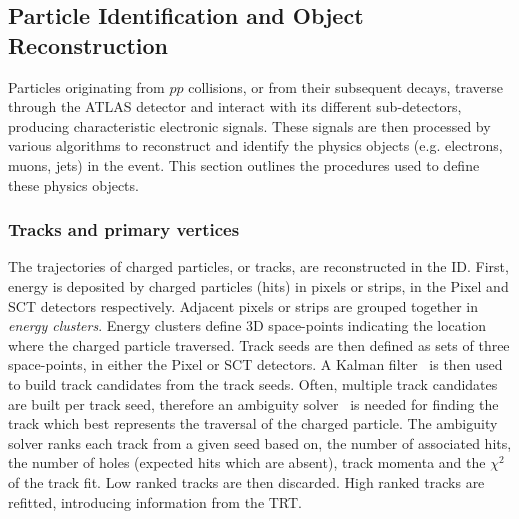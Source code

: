 \subsection{Particle Identification and Object Reconstruction}


Particles originating from $pp$ collisions, or from their subsequent decays, traverse through the ATLAS detector and interact with its different sub-detectors, producing characteristic electronic signals. These signals are then processed by various algorithms to reconstruct and identify the physics objects (e.g. electrons, muons, jets) in the event. This section outlines the procedures used to define these physics objects.

\subsubsection{Tracks and primary vertices}

The trajectories of charged particles, or tracks, are reconstructed in the ID. First, energy is deposited by charged particles (hits) in pixels or strips, in the Pixel and SCT detectors respectively. Adjacent pixels or strips are grouped together in \textit{energy clusters}. Energy clusters define 3D space-points indicating the location where the charged particle traversed. Track seeds are then defined as sets of three space-points, in either the Pixel or SCT detectors. A Kalman filter~\cite{ASTIER2000138} is then used to build track candidates from the track seeds. Often, multiple track candidates are built per track seed, therefore an ambiguity solver~\cite{Choi:2018mie} is needed for finding the track which best represents the traversal of the charged particle. The ambiguity solver ranks each track from a given seed based on, the number of associated hits, the number of holes (expected hits which are absent), track momenta and the $\chi^{2}$ of the track fit. Low ranked tracks are then discarded. High ranked tracks are refitted, introducing information from the TRT.\\

